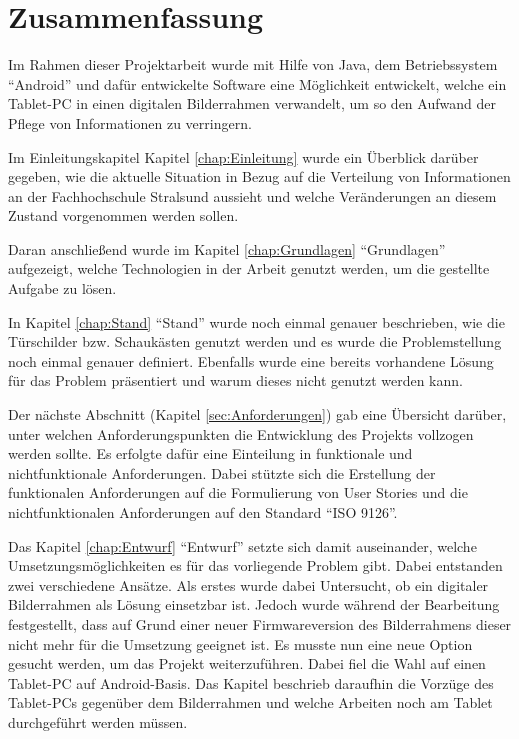 \chapter{ Zusammenfassung }
\vspace{-3cm}
\begin{flushleft}
Im Rahmen dieser Projektarbeit wurde mit Hilfe von Java, dem Betriebssystem ``Android'' und dafür entwickelte Software eine Möglichkeit entwickelt, welche ein Tablet-PC in einen digitalen Bilderrahmen verwandelt, um so den Aufwand der Pflege von Informationen zu verringern.
\newline

Im Einleitungskapitel Kapitel \ref{chap:Einleitung} wurde ein Überblick darüber gegeben, wie die aktuelle Situation in Bezug auf die Verteilung von Informationen an der Fachhochschule Stralsund aussieht und welche Veränderungen an diesem Zustand vorgenommen werden sollen. 
\newline

Daran anschließend wurde im Kapitel \ref{chap:Grundlagen} ``Grundlagen'' aufgezeigt, welche Technologien in der Arbeit genutzt werden, um die gestellte Aufgabe zu lösen. 
\newline

In Kapitel \ref{chap:Stand} ``Stand'' wurde noch einmal genauer beschrieben, wie die Türschilder bzw. Schaukästen genutzt werden und es wurde die Problemstellung noch einmal genauer definiert. Ebenfalls wurde eine bereits vorhandene Lösung für das Problem präsentiert und warum dieses nicht genutzt werden kann. 
\newline

Der nächste Abschnitt (Kapitel \ref{sec:Anforderungen}) gab eine Übersicht darüber, unter welchen Anforderungspunkten die Entwicklung des Projekts vollzogen werden sollte. Es erfolgte dafür eine Einteilung in funktionale und nichtfunktionale
Anforderungen. Dabei stützte sich die Erstellung der funktionalen Anforderungen auf die Formulierung von User Stories und die nichtfunktionalen Anforderungen auf den Standard ``ISO 9126''.
\newline

Das Kapitel \ref{chap:Entwurf} ``Entwurf'' setzte sich damit auseinander, welche Umsetzungsmöglichkeiten es für das vorliegende Problem gibt. Dabei entstanden zwei verschiedene Ansätze.
Als erstes wurde dabei Untersucht, ob ein digitaler Bilderrahmen als Lösung einsetzbar ist. Jedoch wurde während der Bearbeitung festgestellt, dass auf Grund einer neuer Firmwareversion des Bilderrahmens dieser nicht mehr für die Umsetzung geeignet ist. 
Es musste nun eine neue Option gesucht werden, um das Projekt weiterzuführen. Dabei fiel die Wahl auf einen Tablet-PC auf Android-Basis. Das Kapitel beschrieb daraufhin die Vorzüge des Tablet-PCs gegenüber dem Bilderrahmen und welche Arbeiten noch am Tablet durchgeführt werden müssen.
\newline


\end{flushleft}
